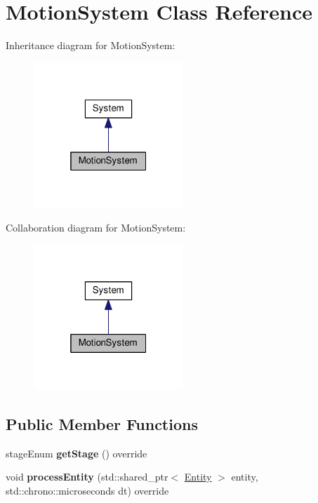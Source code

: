 \hypertarget{classMotionSystem}{\section{Motion\-System Class Reference}
\label{classMotionSystem}
}


Inheritance diagram for Motion\-System\-:
\nopagebreak
\begin{figure}[H]
\begin{center}
\leavevmode
\includegraphics[width=160pt]{classMotionSystem__inherit__graph}
\end{center}
\end{figure}


Collaboration diagram for Motion\-System\-:
\nopagebreak
\begin{figure}[H]
\begin{center}
\leavevmode
\includegraphics[width=160pt]{classMotionSystem__coll__graph}
\end{center}
\end{figure}
\subsection*{Public Member Functions}
\begin{DoxyCompactItemize}
\item 
\hypertarget{classMotionSystem_a4578d9fd296650d754c5131a8baeec27}{stage\-Enum {\bfseries get\-Stage} () override}\label{classMotionSystem_a4578d9fd296650d754c5131a8baeec27}

\item 
\hypertarget{classMotionSystem_a30d345cb7231e8467691f354bbf81c5d}{void {\bfseries process\-Entity} (std\-::shared\-\_\-ptr$<$ \hyperlink{classEntity}{Entity} $>$ entity, std\-::chrono\-::microseconds dt) override}\label{classMotionSystem_a30d345cb7231e8467691f354bbf81c5d}

\end{DoxyCompactItemize}
